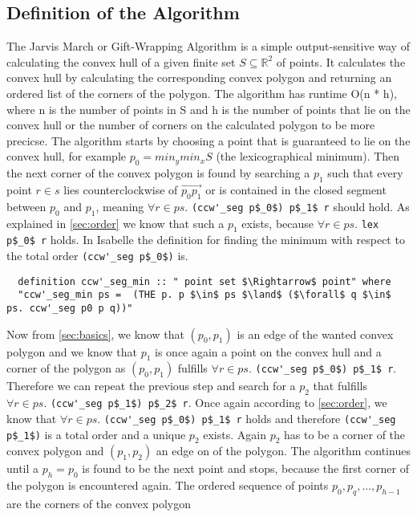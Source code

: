 \subsection{Definition of the Algorithm}
\label{jarvis:def}
The Jarvis March or Gift-Wrapping Algorithm is a simple output-sensitive way of calculating
the convex hull of a given finite set $S \subseteq \mathbb{R}^2$ of points. It calculates the
convex hull by calculating the corresponding convex polygon and returning
an ordered list of the corners of the polygon. The algorithm has runtime O(n * h), where n 
is the number of points in S and h is the number of points that lie on the convex hull or
the number of corners on the calculated polygon to be more precicse. 
The algorithm starts by choosing a point that is guaranteed to lie on the convex hull, 
for example $p_0 = min_y min_x S$ (the lexicographical minimum). Then the next corner of the convex polygon
is found by searching a $p_1$ such that every point $r \in s$ lies counterclockwise
of $\vec{p_0 p_1}$ or is contained in the closed segment between $p_0$ and $p_1$, meaning
$\forall r \in ps.$ \lstinline|(ccw'_seg p$_0$) p$_1$ r| should hold. 
As explained in \ref{sec:order} we know  that such a $p_1$ exists, because 
$\forall r \in ps.$ \lstinline|lex p$_0$ r| holds. In Isabelle the definition for
finding the minimum with respect to the total order \lstinline|(ccw'_seg p$_0$)| is.
\begin{lstlisting}
  definition ccw'_seg_min :: " point set $\Rightarrow$ point" where
  "ccw'_seg_min ps =  (THE p. p $\in$ ps $\land$ ($\forall$ q $\in$ ps. ccw'_seg p0 p q))"
\end{lstlisting}  
Now from \ref{sec:basics}, we 
know that $(p_0,p_1)$ is an edge of the wanted convex polygon and 
we know that $p_1$ is once again a point on
the convex hull and a corner of the polygon as $(p_0,p_1)$ fulfills $\forall r \in ps.$ \lstinline|(ccw'_seg p$_0$) p$_1$ r|. 
Therefore we can repeat the previous step
and search for a $p_2$ that fulfills $\forall r \in ps.$ \lstinline|(ccw'_seg p$_1$) p$_2$ r|. 
Once again according to \ref{sec:order}, we know that $\forall r \in ps.$ \lstinline|(ccw'_seg p$_0$) p$_1$ r|
holds and therefore \lstinline|(ccw'_seg p$_1$)| is a total order and a unique $p_2$ exists.
Again $p_2$ has to be a corner of the convex polygon and $(p_1,p_2)$ an edge on of the
polygon. The algorithm continues until a $p_h = p_0$ is found to be the next point and
stops, because the first corner of the polygon is encountered again. 
The ordered sequence of points $p_0,p_q, ... , p_{h-1}$ are the corners of the convex polygon 
